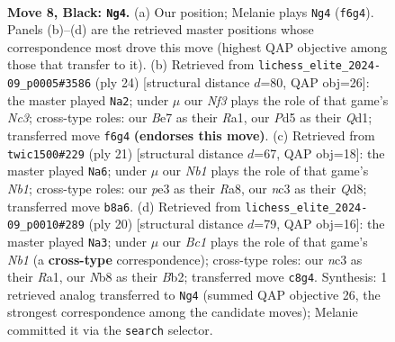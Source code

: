 \documentclass[11pt]{article}
\begin{document}
\begin{figure}[p]\centering
\begin{subfigure}{0.46\textwidth}\centering
\resizebox{\linewidth}{!}{%
\newchessgame
\chessboard[
  setfen={rnbq1rk1/pp2bppp/2p2n2/3p2B1/3P4/2N1P3/PPQ1NPPP/R3KB1R b KQ - 3 8},
  showmover=false,
  pgfstyle=straightmove, color=movearrow, markmove={f6-g4}
]}
\caption{}
\end{subfigure}\hfill
\begin{subfigure}{0.46\textwidth}\centering
\resizebox{\linewidth}{!}{%
\newchessgame
\chessboard[
  setfen={r1b1k2r/2qnbppp/p2ppn2/8/Pp2PP2/1NNBB2P/1PP3P1/R2Q1RK1 w kq - 0 13},
  showmover=false,
  pgfstyle=straightmove, color=movearrow, markmove={c3-a2}
]}
\caption{}
\end{subfigure}
\\[4pt]
\begin{subfigure}{0.46\textwidth}\centering
\resizebox{\linewidth}{!}{%
\newchessgame
\chessboard[
  setfen={rnbqr1k1/1p2bpp1/2p2n1p/p2p4/3P3B/2NBP3/PPQ1NPPP/R4RK1 b - - 1 11},
  showmover=false,
  pgfstyle=straightmove, color=movearrow, markmove={b8-a6}
]}
\caption{}
\end{subfigure}\hfill
\begin{subfigure}{0.46\textwidth}\centering
\resizebox{\linewidth}{!}{%
\newchessgame
\chessboard[
  setfen={r2qkb1r/1b1n1ppp/p3pn2/2p5/P7/4PN2/1B1PBPPP/RN1Q1RK1 w kq - 0 11},
  showmover=false,
  pgfstyle=straightmove, color=movearrow, markmove={b1-a3}
]}
\caption{}
\end{subfigure}
\caption{\textbf{Move 8, Black: \texttt{Ng4}.} (a) Our position; Melanie plays \texttt{Ng4} (\texttt{f6g4}). Panels (b)--(d) are the retrieved master positions whose correspondence most drove this move (highest QAP objective among those that transfer to it). (b) Retrieved from \texttt{lichess\_elite\_2024-09\_p0005\#3586} (ply 24) [structural distance $d$=80, QAP obj=26]: the master played \texttt{Na2}; under $\mu$ our \emph{Nf3} plays the role of that game's \emph{Nc3}; cross-type roles: our \emph{B}e7 as their \emph{R}a1, our \emph{P}d5 as their \emph{Q}d1; transferred move \texttt{f6g4} \textbf{(endorses this move)}. (c) Retrieved from \texttt{twic1500\#229} (ply 21) [structural distance $d$=67, QAP obj=18]: the master played \texttt{Na6}; under $\mu$ our \emph{Nb1} plays the role of that game's \emph{Nb1}; cross-type roles: our \emph{p}e3 as their \emph{R}a8, our \emph{n}c3 as their \emph{Q}d8; transferred move \texttt{b8a6}. (d) Retrieved from \texttt{lichess\_elite\_2024-09\_p0010\#289} (ply 20) [structural distance $d$=79, QAP obj=16]: the master played \texttt{Na3}; under $\mu$ our \emph{Bc1} plays the role of that game's \emph{Nb1} (a \textbf{cross-type} correspondence); cross-type roles: our \emph{n}c3 as their \emph{R}a1, our \emph{N}b8 as their \emph{B}b2; transferred move \texttt{c8g4}. Synthesis: 1 retrieved analog transferred to \texttt{Ng4} (summed QAP objective 26, the strongest correspondence among the candidate moves); Melanie committed it via the \texttt{search} selector.}
\label{fig:thought-m15}
\end{figure}
\end{document}
